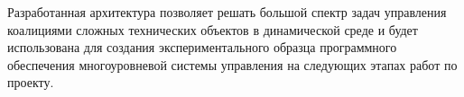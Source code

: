 \documentclass{svjour3}                     %
\begin{document}
Разработанная архитектура позволяет решать большой спектр задач управления коалициями сложных технических объектов в динамической среде и будет использована для создания экспериментального образца программного обеспечения многоуровневой системы управления на следующих этапах работ по проекту.

\end{document}
